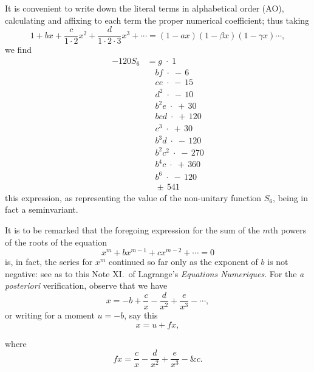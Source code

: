 \documentclass[11pt,a4paper]{article}
\begin{document}
It is convenient to write down the literal terms in alphabetical order (AO), calculating and affixing to each term the proper numerical coefficient; thus taking
\[
1 + bx + \frac{c}{1\cdot 2}x^2 + \frac{d}{1\cdot 2\cdot 3}x^3 + \cdots = (1 - ax)(1 - \beta x)(1 - \gamma x)\cdots,
\]
we find
\begin{align*}
-120 S_6 &= g\;\cdot\;1 \\
&\quad bf\;\cdot\;-\,6 \\
&\quad ce\;\cdot\;-\,15 \\
&\quad d^2\;\cdot\;-\,10 \\
&\quad b^2 e\;\cdot\;+\,30 \\
&\quad bcd\;\cdot\;+\,120 \\
&\quad c^3\;\cdot\;+\,30 \\
&\quad b^3 d\;\cdot\;-\,120 \\
&\quad b^2 c^2\;\cdot\;-\,270 \\
&\quad b^4 c\;\cdot\;+\,360 \\
&\quad b^6\;\cdot\;-\,120 \\
&\quad\pm\,541
\end{align*}
this expression, as representing the value of the non-unitary function $S_6$, being in fact a seminvariant.

\medskip

It is to be remarked that the foregoing expression for the sum of the $m$th powers of the roots of the equation
\[
x^m + b x^{m-1} + c x^{m-2} + \cdots = 0
\]
is, in fact, the series for $x^m$ continued so far only as the exponent of $b$ is not negative: see as to this Note XI.\ of Lagrange's \textit{Equations Numeriques}. For the \textit{a posteriori} verification, observe that we have
\[
x = -b + \frac{c}{x} - \frac{d}{x^2} + \frac{e}{x^3} - \cdots,
\]
or writing for a moment $u = -b$, say this
\[
x = u + fx,
\]

where
\[
fx = \frac{c}{x} - \frac{d}{x^2} + \frac{e}{x^3} - \&c.
\]
\end{document}

